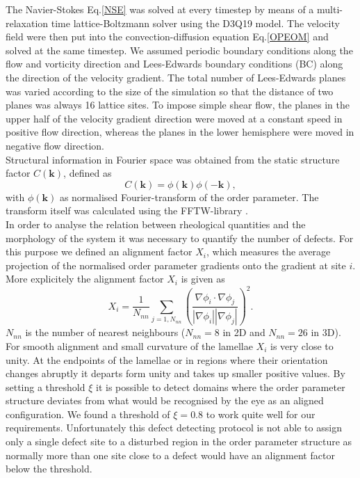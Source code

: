 \documentclass[8.5pt,twoside,twocolumn]{article}
\begin{document}
The Navier-Stokes Eq.\ref{NSE} was solved at every timestep by means of a multi-relaxation time lattice-Boltzmann solver \cite{dHumieres02,Adhikari05} using the D3Q19 model.
The velocity field were then put into the convection-diffusion equation Eq.\ref{OPEOM} and solved at the same timestep. 
We assumed periodic boundary conditions along the flow and vorticity direction and Lees-Edwards boundary conditions (BC) \cite{Wagner02} along the direction of the velocity gradient.
The total number of Lees-Edwards planes was varied according to the size of the simulation so that the distance of two planes was always 16 lattice sites.
To impose simple shear flow, the planes in the upper half of the velocity gradient direction were moved at a constant speed in positive flow direction, whereas the planes in the lower hemisphere were moved in negative flow direction.\\
Structural information in Fourier space was obtained from the static structure factor $C({\mathbf k})$, defined as
\begin{equation}
C({\mathbf k})=\phi({\mathbf k})\phi(-{\mathbf k}),
\end{equation}
with $\phi({\mathbf k})$ as normalised Fourier-transform of the order parameter.
The transform itself was calculated using the FFTW-library \cite{FFTW}.\\
In order to analyse the relation between rheological quantities and the morphology of the system it was necessary to quantify the number of defects.
For this purpose we defined an alignment factor $X_i$, which measures the average projection of the normalised order parameter gradients onto the gradient at site $i$.
More explicitely the alignment factor $X_i$ is given as
\begin{equation}\label{alignment}
X_i=\frac{1}{N_{nn}} \sum_{j=1,N_{nn}}\left(\frac{\nabla \phi_i \cdot \nabla \phi_j}{|\nabla\phi_i||\nabla\phi_j|}\right)^2. 
\end{equation}
$N_{nn}$ is the number of nearest neighbours ($N_{nn}=8$ in 2D and $N_{nn}=26$ in 3D).
For smooth alignment and small curvature of the lamellae $X_i$ is very close to unity.
At the endpoints of the lamellae or in regions where their orientation changes abruptly it departs form unity and takes up smaller positive values.
By setting a threshold $\xi$ it is possible to detect domains where the order parameter structure deviates from what would be recognised by the eye as an aligned configuration.
We found a threshold of $\xi=0.8$ to work quite well for our requirements.
Unfortunately this defect detecting protocol is not able to assign only a single defect site to a disturbed region in the order parameter structure as normally more than one site close to a defect would have an alignment factor below the threshold.
\end{document}
